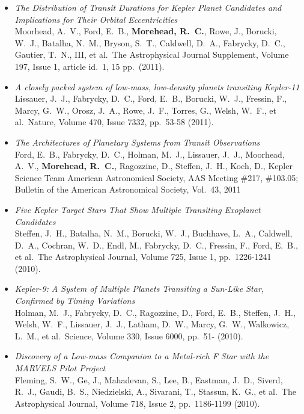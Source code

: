 \documentclass[12pt,letterpaper,sans]{moderncv} %
\begin{document}
\begin{itemize}
 \item \emph{ The Distribution of Transit Durations for Kepler Planet 
Candidates and Implications for Their Orbital Eccentricities } \\ Moorhead, 
A.~V., Ford, E.~B., \textbf{Morehead, R.~C.}, Rowe, J., Borucki, W.~J., Batalha, 
N.~M., Bryson, S.~T., Caldwell, D.~A., Fabrycky, D.~C., Gautier, T.~N., 
III, et al.\ The Astrophysical Journal Supplement, Volume 197, Issue 1, 
article id.~1, 15 pp.~(2011).\ \\ 

 \item \emph{ A closely packed system of low-mass, low-density planets 
transiting Kepler-11 } \\ Lissauer, J.~J., Fabrycky, D.~C., Ford, E.~B., 
Borucki, W.~J., Fressin, F., Marcy, G.~W., Orosz, J.~A., Rowe, J.~F., 
Torres, G., Welsh, W.~F., et al.\ Nature, Volume 470, Issue 7332, pp.~53-58 
(2011).\ \\ 


 \item \emph{ The Architectures of Planetary Systems from Transit 
Observations } \\ Ford, E.~B., Fabrycky, D.~C., Holman, M.~J., Lissauer, 
J.~J., Moorhead, A.~V., \textbf{Morehead, R.~C.}, Ragozzine, D., Steffen, J.~H., 
Koch, D., Kepler Science Team American Astronomical Society, AAS Meeting 
\#217, \#103.05; Bulletin of the American Astronomical Society, Vol.~43, 
2011 \\ 

 \item \emph{ Five Kepler Target Stars That Show Multiple Transiting 
Exoplanet Candidates } \\ Steffen, J.~H., Batalha, N.~M., Borucki, W.~J., 
Buchhave, L.~A., Caldwell, D.~A., Cochran, W.~D., Endl, M., Fabrycky, 
D.~C., Fressin, F., Ford, E.~B., et al.\ The Astrophysical Journal, Volume 
725, Issue 1, pp.~1226-1241 (2010).\ \\ 

 \item \emph{ Kepler-9: A System of Multiple Planets Transiting a 
Sun-Like Star, Confirmed by Timing Variations } \\ Holman, M.~J., Fabrycky, 
D.~C., Ragozzine, D., Ford, E.~B., Steffen, J.~H., Welsh, W.~F., Lissauer, 
J.~J., Latham, D.~W., Marcy, G.~W., Walkowicz, L.~M., et al.\ Science, 
Volume 330, Issue 6000, pp.~51- (2010).\ \\ 

 \item \emph{ Discovery of a Low-mass Companion to a Metal-rich F Star 
with the MARVELS Pilot Project } \\ Fleming, S.~W., Ge, J., Mahadevan, S., 
Lee, B., Eastman, J.~D., Siverd, R.~J., Gaudi, B.~S., Niedzielski, A., 
Sivarani, T., Stassun, K.~G., et al.\ The Astrophysical Journal, Volume 
718, Issue 2, pp.~1186-1199 (2010).\ \\ 


\end{itemize}
\end{document}
